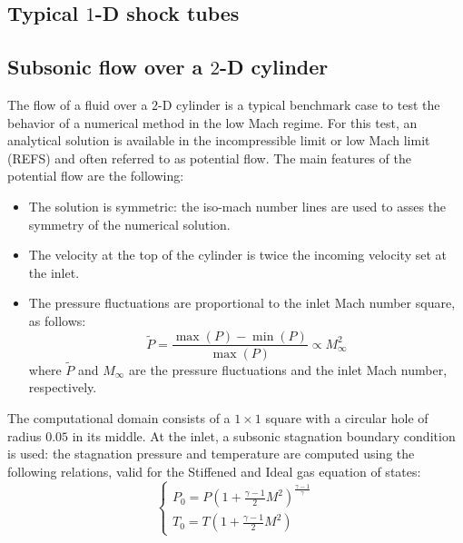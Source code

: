 \subsection{Typical $1$-D shock tubes \cite{Toro}} \label{sec:1d_toro}
\subsection{Subsonic flow over a $2$-D cylinder} \label{sec:cylinder}
The flow of a fluid over a $2$-D cylinder is a typical benchmark case to test the behavior of a numerical method in the low Mach regime. For this test, an analytical solution is available in the incompressible limit or low Mach limit (REFS) and often referred to as potential flow. The main features of the potential flow are the following:
\begin{itemize}
\item The solution is symmetric: the iso-mach number lines are used to asses the symmetry of the numerical solution.
\item The velocity at the top of the cylinder is twice the incoming velocity set at the inlet.
\item The pressure fluctuations are proportional to the inlet Mach number square, as follows: 
\begin{equation}
\tilde{P} = \frac{\max(P) - \min(P)}{\max(P)}  \propto M_{\infty}^2\nonumber
\end{equation}
where $\tilde{P}$ and $M_{\infty}$ are the pressure fluctuations and the inlet Mach number, respectively.
\end{itemize}
The computational domain consists of a $1\times 1$ square with a circular hole of radius $0.05$ in its middle. At the inlet, a subsonic stagnation boundary condition is used: the stagnation pressure and temperature are computed using the following relations, valid for the Stiffened and Ideal gas equation of states:
\begin{equation}
\label{eq:stagnation_relations}
\left\{
\begin{array}{l}
P_0 = P\left( 1 + \frac{\gamma-1}{2} M^2 \right)^{\frac{\gamma-1}{\gamma}} \\
T_0 = T\left( 1 + \frac{\gamma-1}{2} M^2 \right)
\end{array}
\right.
\end{equation}

